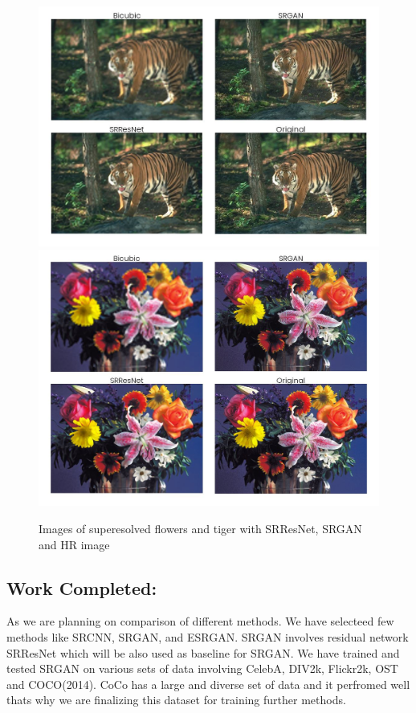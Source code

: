     \begin{figure}
        \centering
        \includegraphics[width=5.5in]{./figures/examples/tiger.jpg}
        \includegraphics[width=5.5in]{./figures/examples/flowers.jpg}
        \caption{Images of superesolved flowers and tiger with SRResNet, SRGAN and HR image}
    \end{figure}      
  
\clearpage
\newpage
\subsection{Work Completed:}
As we are planning on comparison of different methods. We have selecteed few methods like SRCNN, SRGAN, and ESRGAN. SRGAN involves residual network SRResNet which will be also used as baseline for SRGAN. We have trained and tested SRGAN on various sets of data involving CelebA, DIV2k, Flickr2k, OST and COCO(2014). CoCo has a large and diverse set of data and it perfromed well thats why we are finalizing this dataset for training further methods. 
